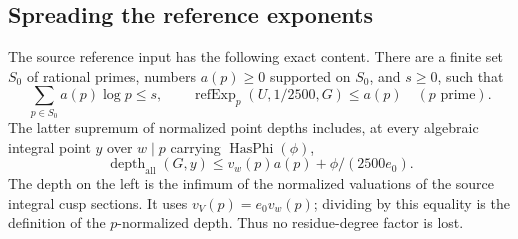 \subsection{Spreading the reference exponents}
The source reference input has the following exact content.
There are a finite set \(S_0\) of rational primes, numbers
\(a(p)\geq0\) supported on \(S_0\), and \(s\geq0\), such that
\[
 \sum_{p\in S_0}a(p)\log p\leq s,\qquad
 \operatorname{refExp}_p(U,1/2500,G)\leq a(p)
       \quad(p\text{ prime}).                      \tag{C13}\label{eq:ftb-ref-budget}
\]
The latter supremum of normalized point depths includes, at every
algebraic integral point \(y\) over \(w\mid p\) carrying
\(\operatorname{HasPhi}(\phi)\),
\[
 \operatorname{depth}_{\mathrm{all}}(G,y)
       \leq v_w(p)a(p)+\phi/(2500e_0).              \tag{C14}\label{eq:ftb-ref-point}
\]
The depth on the left is the infimum of the normalized valuations of
the source integral cusp sections.  It uses
\(v_V(p)=e_0v_w(p)\); dividing by this equality is the definition
of the \(p\)-normalized depth.  Thus no residue-degree factor is lost.

